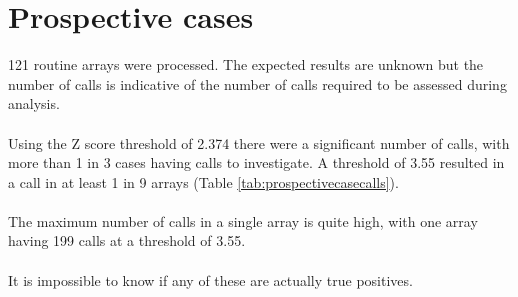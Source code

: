 \section{Prospective cases}
121 routine arrays were processed. The expected results are unknown but the number of calls is indicative of the number of calls required to be assessed during analysis.
\paragraph*{}
Using the Z score threshold of 2.374 there were a significant number of calls, with more than 1 in 3 cases having calls to investigate. A threshold of 3.55 resulted in a call in at least 1 in 9 arrays (Table \ref{tab:prospectivecasecalls}).
\paragraph*{}
The maximum number of calls in a single array is quite high, with one array having 199 calls at a threshold of 3.55.
\paragraph*{}
It is impossible to know if any of these are actually true positives.

